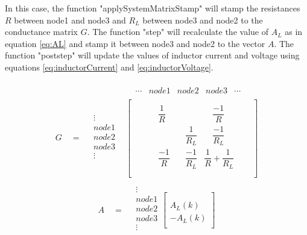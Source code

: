 In this case, the function "applySystemMatrixStamp" will stamp the resistances $R$ between node1 and node3 and $R_L$ between node3 and node2 to the conductance matrix $G$. The function "step" will recalculate the value of $A_L$ as in equation \ref{eq:AL} and stamp it between node3 and node2 to the vector $A$. The function "poststep" will update the values of inductor current and voltage using equations \ref{eq:inductorCurrent} and \ref{eq:inductorVoltage}.

\begin{align}
\begin{split}
&
\begin{matrix}
& \cdots & node1 & node2 &  node3 & \cdots
\end{matrix}\\[-6pt]
G \quad = \quad
\begin{matrix}
\vdots\\[8pt]
node1\\[8pt]
node2\\[8pt]
node3\\[8pt]
\vdots\\
\end{matrix}
&
\begin{bmatrix}
	\quad & \quad &  \\[8pt]
	\quad & \quad \dfrac{1}{R} & \quad & \quad \dfrac{-1}{R} & \quad  \\[8pt]
	\quad & \quad & \quad \dfrac{1}{R_L} & \quad \dfrac{-1}{R_L} & \quad \\[8pt]
	\quad & \quad \dfrac{-1}{R} & \quad \dfrac{-1}{R_L} & \dfrac{1}{R}+\dfrac{1}{R_L} & \quad\\[8pt]
	\quad\\ 
\end{bmatrix}
\end{split}
\end{align}
\begin{align}
\begin{split}
A\quad = \quad
\begin{matrix}
\vdots\\[8pt]
node1\\[8pt]
node2\\[8pt]
node3\\[8pt]
\vdots\\
\end{matrix}
\begin{bmatrix}
	\quad \\[8pt]
	\quad \\[8pt]
	A_L(k) \\[8pt]
	-A_L(k) \\[8pt]
	\quad
\end{bmatrix}
\end{split}
\end{align}

